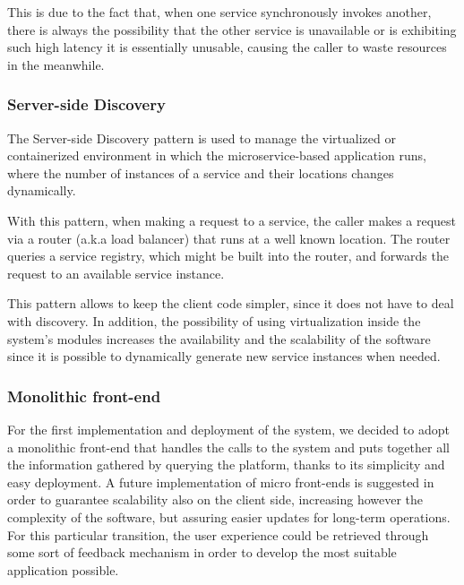 This is due to the fact that, when one service synchronously invokes another, there is always the possibility that the other service is unavailable or is exhibiting such high latency it is essentially unusable, causing the caller to waste resources in the meanwhile.

\subsubsection{Server-side Discovery}
The Server-side Discovery pattern is used to manage the virtualized or containerized environment in which the microservice-based application runs, where the number of instances of a service and their locations changes dynamically.

With this pattern, when making a request to a service, the caller makes a request via a router (a.k.a load balancer) that runs at a well known location. The router queries a service registry, which might be built into the router, and forwards the request to an available service instance.

This pattern allows to keep the client code simpler, since it does not have to deal with discovery. In addition, the possibility of using virtualization inside the system’s modules increases the availability and the scalability of the software since it is possible to dynamically generate new service instances when needed.

\subsubsection{Monolithic front-end}
For the first implementation and deployment of the system, we decided to adopt a monolithic front-end that handles the calls to the system and puts together all the information gathered by querying the platform, thanks to its simplicity and easy deployment. A future implementation of micro front-ends is suggested in order to guarantee scalability also on the client side, increasing however the complexity of the software, but assuring easier updates for long-term operations. For this particular transition, the user experience could be retrieved through some sort of feedback mechanism in order to develop the most suitable application possible.
